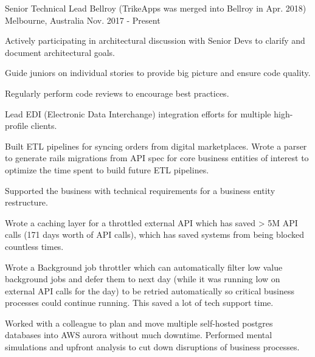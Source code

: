 

\begin{cventries}

  \cventry
    {Senior Technical Lead} %
    {Bellroy (TrikeApps was merged into Bellroy in Apr. 2018)} %
    {Melbourne, Australia} %
    {Nov. 2017 - Present} %
    {
      \begin{cvitems} %
        \item {Actively participating in architectural discussion with Senior Devs to clarify and document architectural goals.}
        \item {Guide juniors on individual stories to provide big picture and ensure code quality.}
        \item {Regularly perform code reviews to encourage best practices.}
        \item {Lead EDI (Electronic Data Interchange) integration efforts for multiple high-profile clients.}
        \item {Built ETL pipelines for syncing orders from digital marketplaces. Wrote a parser to generate rails migrations from API spec for core business entities of interest to optimize the time spent to build future ETL pipelines.}
        \item {Supported the business with technical requirements for a business entity restructure.}
        \item {Wrote a caching layer for a throttled external API which has saved > 5M API calls (171 days worth of API calls), which has saved systems from being blocked countless times.}
        \item {Wrote a Background job throttler which can automatically filter low value background jobs and defer them to next day (while it was running low on external API calls for the day) to be retried automatically so critical business processes could continue running. This saved a lot of tech support time.}
        \item {Worked with a colleague to plan and move multiple self-hosted postgres databases into AWS aurora without much downtime. Performed mental simulations and upfront analysis to cut down disruptions of business processes.}

\end{cvitems}}
\end{cventries}
